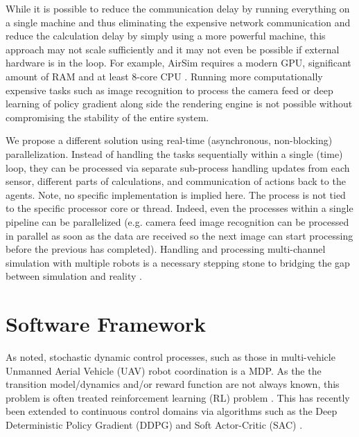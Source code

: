 \documentclass{article}
\let\cite\citep
\begin{document}
While it is possible to reduce the communication delay by running everything on a single machine and thus eliminating the expensive network communication and reduce the calculation delay by simply using a more powerful machine, this approach may not scale sufficiently and it may not even be possible if external hardware is in the loop.   For example, AirSim requires a modern GPU, significant amount of RAM and at least 8-core CPU \cite{shah2018airsim}. Running more computationally expensive tasks such as image recognition to process the camera feed or deep learning of policy gradient along side the rendering engine is not possible without compromising the stability of the entire system.

We propose a different solution using real-time (asynchronous, non-blocking) parallelization. Instead of handling the tasks sequentially within a single (time) loop, they can be processed via separate sub-process  %
handling updates from each sensor, different parts of calculations, and communication of actions back to the agents.
Note, no specific implementation is implied here. The process is not tied to the specific processor core or thread.
Indeed, even the processes within a single pipeline can be parallelized (e.g. camera feed image recognition can be processed in parallel as soon as the data are received so the next image can start processing before the previous has completed).
Handling and processing multi-channel simulation with multiple robots is a necessary stepping stone to bridging the gap between simulation and reality \cite{loquercio2019deep, james2019sim}. %



\section{Software Framework}

As noted, stochastic dynamic control processes, such as those in multi-vehicle Unmanned Aerial Vehicle (UAV) robot coordination is a MDP.   As the the transition model/dynamics and/or reward function are not always known, this problem is often treated reinforcement learning (RL) problem \cite{sutton2018reinforcement}.  This has recently been extended to continuous control domains  \cite{henderson2018deep} via algorithms such as the Deep Deterministic Policy Gradient (DDPG) \cite{DDPG} and Soft Actor-Critic (SAC) \cite{SAC}.
\end{document}
